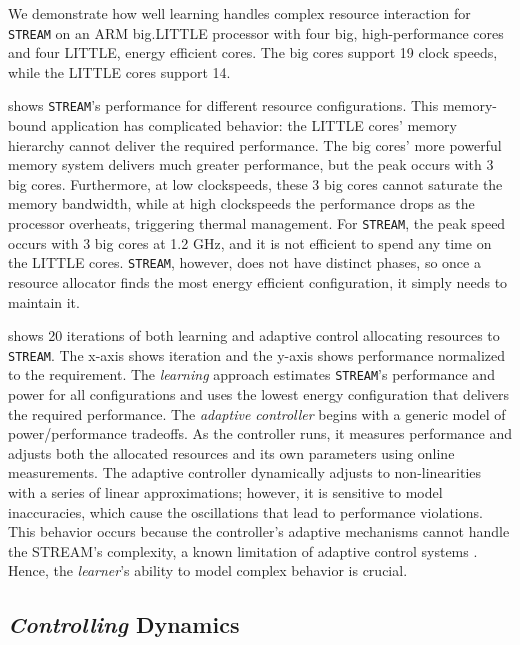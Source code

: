 We demonstrate how well learning handles complex resource interaction
for \texttt{STREAM} on an ARM big.LITTLE processor with four big,
high-performance cores and four LITTLE, energy efficient cores.  The
big cores support 19 clock speeds, while the LITTLE cores support 14.


 shows \texttt{STREAM}'s performance for
different resource configurations.  This memory-bound application has
complicated behavior: the LITTLE cores' memory hierarchy cannot
deliver the required performance.  The big cores' more powerful memory
system delivers much greater performance, but the peak occurs with 3
big cores.  Furthermore, at low clockspeeds, these 3 big cores cannot
saturate the memory bandwidth, while at high clockspeeds the
performance drops as the processor overheats, triggering thermal
management.  For \texttt{STREAM}, the peak speed occurs with 3 big
cores at 1.2 GHz, and it is not efficient to spend any time on the
LITTLE cores.  \texttt{STREAM}, however, does not have distinct
phases, so once a resource allocator finds the most energy efficient
configuration, it simply needs to maintain it.


 shows 20 iterations of both learning
\cite{LEO} and adaptive control \cite{POET} allocating resources to
\texttt{STREAM}.  The x-axis shows iteration and the y-axis shows
performance normalized to the requirement.  The \emph{learning}
approach estimates \texttt{STREAM}'s performance and power for all
configurations and uses the lowest energy configuration that delivers
the required performance.  The \emph{adaptive controller} begins with
a generic model of power/performance tradeoffs.  As the controller
runs, it measures performance and adjusts both the allocated resources
and its own parameters using online measurements.  The adaptive
controller dynamically adjusts to non-linearities with a series of
linear approximations; however, it is sensitive to model inaccuracies,
which cause the oscillations that lead to performance violations.
This behavior occurs because the controller's adaptive mechanisms
cannot handle the STREAM's complexity, a known limitation of adaptive
control systems \cite{ControlWare,POET,ICSE2014}.  Hence, the
\emph{learner}'s ability to model complex behavior is crucial.

\subsection{\emph{Controlling} Dynamics}

